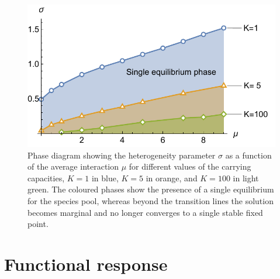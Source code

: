 \documentclass[12pt]{article}
\begin{document}
\begin{figure}[h]
    \centering
    \includegraphics{phased_complete.pdf}
    \caption{Phase diagram showing the heterogeneity parameter $\sigma$ as a function of the average interaction $\mu$ for different values of the carrying capacities, $K=1$ in blue, $K=5$ in orange, and $K=100$ in light green. The coloured phases show the presence of a single equilibrium for the species pool, whereas beyond the transition lines the solution becomes marginal and no longer converges to a single stable fixed point.}
    \label{phasediagram_K}
\end{figure}


\section{Functional response}
\end{document}
